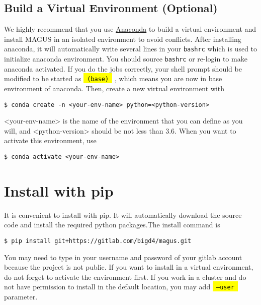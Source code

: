 \documentclass[12pt,oneside]{book}
\newcommand{\code}[1]{
  \begingroup
  \sethlcolor{Seashell}
  {\hl{\texttt{~#1~}}}
  \endgroup
}
\newcommand{\file}[1]{\texttt{#1}}
\newcommand{\chref}[3][blue]{\textcolor{#1}{\href{#2}{#3}}} %
\begin{document}
\subsection{Build a Virtual Environment (Optional)}
We highly recommend that you use \chref{https://www.anaconda.com}{Anaconda} to build a virtual environment and install MAGUS in an isolated environment to avoid conflicts. After installing anaconda, it will automatically write several lines in your \file{bashrc} which is used to initialize anaconda environment. You should source \file{bashrc} or re-login to make anaconda activated.
If you do the jobs correctly, your shell prompt should be modified to be started as \code{(base)}, which means you are now in base environment of anaconda. Then, create a new virtual environment with
\begin{tcolorbox}
\begin{verbatim}
$ conda create -n <your-env-name> python=<python-version>
\end{verbatim}
\end{tcolorbox}
<your-env-name> is the name of the environment that you can define as you will, and <python-version> should be not less than 3.6. When you want to activate this environment, use
\begin{tcolorbox}
\begin{verbatim}
$ conda activate <your-env-name>
\end{verbatim}
\end{tcolorbox}

\section{Install with pip}
It is convenient to install with pip. It will automatically download the source code and install the required python packages.The install command is
\begin{tcolorbox}
    \begin{verbatim}
$ pip install git+https://gitlab.com/bigd4/magus.git
    \end{verbatim}
\end{tcolorbox}
You may need to type in your username and password of your gitlab account because the project is not public. If you want to install in a virtual environment, do not forget to activate the environment first. If you work in a cluster and do not have permission to install in the default location, you may add \code{--user} parameter.
\end{document}
